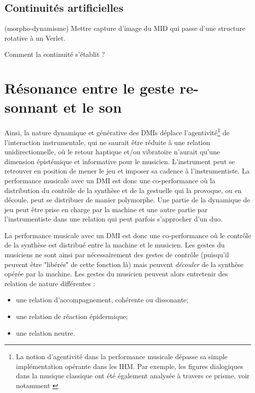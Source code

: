 \subsection{Continuités artificielles}
(morpho-dynamisme)
Mettre capture d'image du MID qui passe d'une structure rotative à un Verlet.

Comment la continuité s'établit ?



\section{Résonance entre le geste re-sonnant et le son}

Ainsi, la nature dynamique et générative des DMIs déplace l'agentivité\footnote{La notion d'agentivité dans la performance musicale dépasse sa simple implémentation opérante dans les IHM. Par exemple, les figures dialogiques dans la musique classique ont été également analysée à travers ce prisme, voir notamment \cite{graybill_whose_2016}} de l'interaction instrumentale, qui ne saurait être réduite à une relation unidirectionnelle, où le retour haptique et/ou vibratoire n'aurait qu'une dimension épistémique et informative pour le musicien.
L'instrument peut se retrouver en position de mener le jeu et imposer sa cadence à l'instrumentiste. La performance musicale avec un DMI est donc une co-performance où la distribution du contrôle de la synthèse et de la gestuelle qui la provoque, ou en découle, peut se distribuer de manier polymorphe. Une partie de la dynamique de jeu peut être prise en charge par la machine et une autre partie par l'instrumentiste dans une relation qui peut parfois s'approcher d'un duo.

 La performance musicale avec un DMI est donc une co-performance où le contrôle de la synthèse est distribué entre la machine et le musicien. 
 Les gestes du musiciens ne sont ainsi par nécessairement des gestes de contrôle (puisqu'il peuvent être "libérés" de cette fonction là) mais peuvent \textit{découler} de la synthèse opérée par la machine. Les gestes du musicien peuvent alors entretenir des relation de nature différentes :

\vspace{-1em}
\begin{itemize}[noitemsep]
\item une relation d'accompagnement, cohérente ou dissonante;
\item une relation de réaction épidermique;
\item une relation neutre.
\end{itemize}
 
